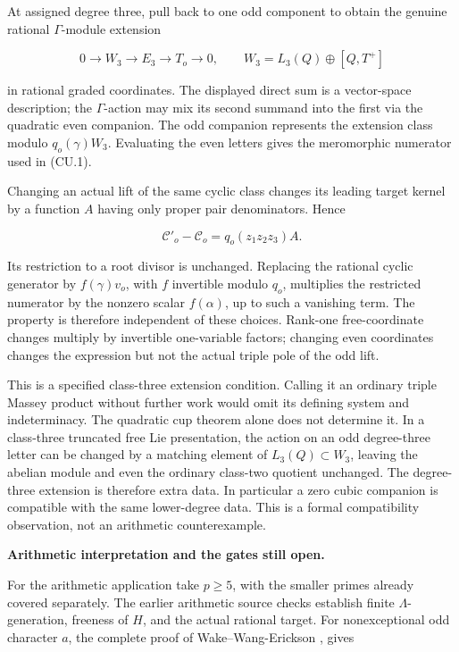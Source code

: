 \documentclass[11pt,a4paper]{article}
\theoremstyle{definition}
\begin{document}
At assigned degree three, pull back to one odd component to obtain the genuine rational \(\Gamma\)-module extension

\[
0\longrightarrow W_3
\longrightarrow E_3
\longrightarrow T_o
\longrightarrow0,
\qquad
W_3=L_3(Q)\oplus[Q,T^+]
\]

in rational graded coordinates. The displayed direct sum is a vector-space description; the \(\Gamma\)-action may mix its second summand into the first via the quadratic even companion. The odd companion represents the extension class modulo \(q_o(\gamma)W_3\). Evaluating the even letters gives the meromorphic numerator used in (CU.1).

Changing an actual lift of the same cyclic class changes its leading target kernel by a function \(A\) having only proper pair denominators. Hence

\[
\mathcal C'_o-\mathcal C_o=q_o(z_1z_2z_3)A.
\]

Its restriction to a root divisor is unchanged. Replacing the rational cyclic generator by \(f(\gamma)v_o\), with \(f\) invertible modulo \(q_o\), multiplies the restricted numerator by the nonzero scalar \(f(\alpha)\), up to such a vanishing term. The property is therefore independent of these choices. Rank-one free-coordinate changes multiply by invertible one-variable factors; changing even coordinates changes the expression but not the actual triple pole of the odd lift.

This is a specified class-three extension condition. Calling it an ordinary triple Massey product without further work would omit its defining system and indeterminacy. The quadratic cup theorem alone does not determine it. In a class-three truncated free Lie presentation, the action on an odd degree-three letter can be changed by a matching element of \(L_3(Q)\subset W_3\), leaving the abelian module and even the ordinary class-two quotient unchanged. The degree-three extension is therefore extra data. In particular a zero cubic companion is compatible with the same lower-degree data. This is a formal compatibility observation, not an arithmetic counterexample.

\par\medskip\noindent\textbf{Arithmetic interpretation and the gates still open.}

For the arithmetic application take \(p\ge5\), with the smaller primes already covered separately. The earlier arithmetic source checks establish finite \(\Lambda\)-generation, freeness of \(H\), and the actual rational target. For nonexceptional odd character \(a\), the complete proof of Wake--Wang-Erickson \cite[Proposition~2.2.6 and proof, pp.~3--4]{WakeWangErickson2017}, gives
\end{document}
